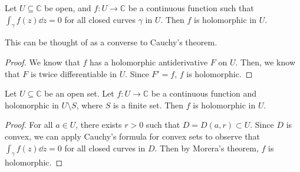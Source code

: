 \begin{theorem}
	Let \( U \subseteq \mathbb C \) be open, and \( f \colon U \to \mathbb C \) be a continuous function such that \( \int_\gamma f(z) \dd{z} = 0 \) for all closed curves \( \gamma \) in \( U \).
	Then \( f \) is holomorphic in \( U \).
\end{theorem}
\begin{remark}
	This can be thought of as a converse to Cauchy's theorem.
\end{remark}
\begin{proof}
	We know that \( f \) has a holomorphic antiderivative \( F \) on \( U \).
	Then, we know that \( F \) is twice differentiable in \( U \).
	Since \( F' = f \), \( f \) is holomorphic.
\end{proof}
\begin{corollary}
	Let \( U \subseteq \mathbb C \) be an open set.
	Let \( f \colon U \to \mathbb C \) be a continuous function and holomorphic in \( U \setminus S \), where \( S \) is a finite set.
	Then \( f \) is holomorphic in \( U \).
\end{corollary}
\begin{proof}
	For all \( a \in U \), there exists \( r > 0 \) such that \( D = D(a,r) \subset U \).
	Since \( D \) is convex, we can apply Cauchy's formula for convex sets to observe that \( \int_\gamma f(z) \dd{z} = 0 \) for all closed curves in \( D \).
	Then by Morera's theorem, \( f \) is holomorphic.
\end{proof}


